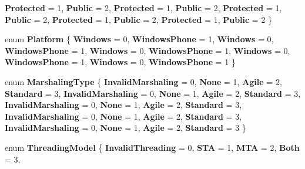 \begin{DoxyCompactItemize}
{\bfseries Protected} = 1, 
{\bfseries Public} = 2, 
{\bfseries Protected} = 1, 
{\bfseries Public} = 2, 
\newline
{\bfseries Protected} = 1, 
{\bfseries Public} = 2, 
{\bfseries Protected} = 1, 
{\bfseries Public} = 2, 
\newline
{\bfseries Protected} = 1, 
{\bfseries Public} = 2
 \}
\item 
\mbox{\label{namespace_windows_1_1_foundation_1_1_metadata_ac74fec362ca55a3b5379960a1fde476d}} 
enum {\bfseries Platform} \{ \newline
{\bfseries Windows} = 0, 
{\bfseries Windows\+Phone} = 1, 
{\bfseries Windows} = 0, 
{\bfseries Windows\+Phone} = 1, 
\newline
{\bfseries Windows} = 0, 
{\bfseries Windows\+Phone} = 1, 
{\bfseries Windows} = 0, 
{\bfseries Windows\+Phone} = 1, 
\newline
{\bfseries Windows} = 0, 
{\bfseries Windows\+Phone} = 1
 \}
\item 
\mbox{\label{namespace_windows_1_1_foundation_1_1_metadata_af96a9466daa74933d167e8e5777f203f}} 
enum {\bfseries Marshaling\+Type} \{ \newline
{\bfseries Invalid\+Marshaling} = 0, 
{\bfseries None} = 1, 
{\bfseries Agile} = 2, 
{\bfseries Standard} = 3, 
\newline
{\bfseries Invalid\+Marshaling} = 0, 
{\bfseries None} = 1, 
{\bfseries Agile} = 2, 
{\bfseries Standard} = 3, 
\newline
{\bfseries Invalid\+Marshaling} = 0, 
{\bfseries None} = 1, 
{\bfseries Agile} = 2, 
{\bfseries Standard} = 3, 
\newline
{\bfseries Invalid\+Marshaling} = 0, 
{\bfseries None} = 1, 
{\bfseries Agile} = 2, 
{\bfseries Standard} = 3, 
\newline
{\bfseries Invalid\+Marshaling} = 0, 
{\bfseries None} = 1, 
{\bfseries Agile} = 2, 
{\bfseries Standard} = 3
 \}
\item 
\mbox{\label{namespace_windows_1_1_foundation_1_1_metadata_a4b7486fa60d9faccd8b65757f42b1aa1}} 
enum {\bfseries Threading\+Model} \{ \newline
{\bfseries Invalid\+Threading} = 0, 
{\bfseries S\+TA} = 1, 
{\bfseries M\+TA} = 2, 
{\bfseries Both} = 3, 
\newline

\end{DoxyCompactItemize}
